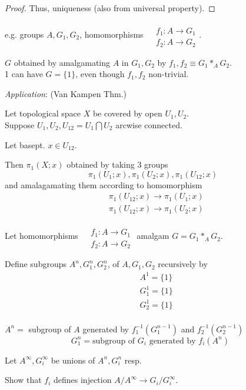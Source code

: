 \documentclass[10pt]{amsart}
\newcommand{\exercisehead}[1]
  { \smallskip
   \noindent{\small\bf Exercise #1.}
  }
\begin{document}
\begin{multicols*}{2}
\begin{proof}
Thus, uniqueness (also from universal property).  
\end{proof}

e.g. groups $A,G_1,G_2$, homomorphisms $\begin{aligned} & \quad \\ 
& f_1 : A \to G_1 \\
& f_2 : A \to G_2 
\end{aligned}$.  

$G$ obtained by amalgamating $A$ in $G_1,G_2$ by $f_1,f_2 \equiv G_1 *_A G_2$.  \\
1 can have $G=\lbrace 1 \rbrace$, even though $f_1,f_2$ non-trivial.  

\emph{Application}: (Van Kampen Thm.)

Let topological space $X$ be covered by open $U_1,U_2$.   \\
Suppose $U_1,U_2, U_{12}=U_1\bigcap U_2$ arcwise connected.  

Let basept. $x\in U_{12}$.  

Then $\pi_1(X;x)$ obtained by taking 3 groups 
\[
\pi_1(U_1;x), \pi_1(U_2;x), \pi_1(U_{12};x)
\]
and amalagamating them according to homomorphism
\[
\begin{aligned}
& \pi_1(U_{12};x) \to \pi_1(U_1;x)  \\
& \pi_1(U_{12};x) \to \pi_1(U_2;x)
\end{aligned}
\]

\exercisehead{1}  
Let homomorphisms $\begin{aligned} & \quad \\
	& f_1 : A \to G_1 \\ 
	& f_2: A \to G_2 \end{aligned}
$
amalgam $G=G_1 *_A G_2$.  

Define subgroups $A^n,G_1^n, G_2^n$, of $A,G_1,G_2$ recursively by 
\[
\begin{aligned}
& A^1 = \lbrace 1 \rbrace \\
& G_1^1 = \lbrace 1 \rbrace \\ 
& G_2^1 = \lbrace 1 \rbrace \\ 
\end{aligned}
\]

$A^n = $ subgroup of $A$ generated by $f_1^{-1}(G_1^{n-1})$ and $f_2^{-1}(G_2^{n-1})$  
\[
G_1^n = \text{subgroup of $G_i$ generated by $f_i(A^n)$ }
\]

Let $A^{\infty}, G_i^{\infty}$ be unions of $A^n, G_i^n$ resp.  

Show that $f_i$ defines injection $A/A^{\infty} \to G_i/G_i^{\infty}$.  


\end{multicols*}
\end{document}
